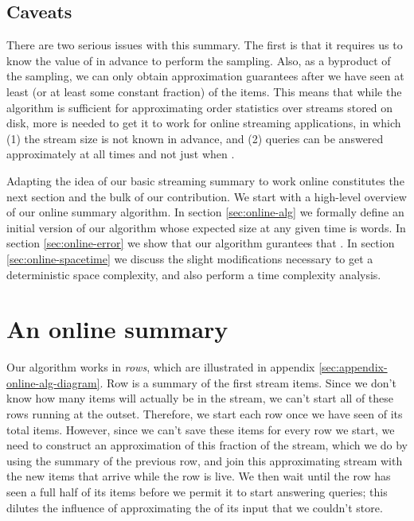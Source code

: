 \documentclass{article}
\theoremstyle{plain}
\begin{document}
\subsection{Caveats}

There are two serious issues with this summary. The first is that it requires us
to know the value of  in advance to perform the sampling. Also, as a
byproduct of the sampling, we can only obtain approximation guarantees after we
have seen at least  (or at least some constant fraction) of the items.
This means that while the algorithm is sufficient for approximating order
statistics over streams stored on disk, more is needed to get it to work for
online streaming applications, in which (1) the stream size  is not known in
advance, and (2) queries can be answered approximately at all times 
and not just when .

Adapting the idea of our basic streaming summary to work online constitutes the
next section and the bulk of our contribution.
We start with a high-level overview of our online summary algorithm.
In section \ref{sec:online-alg} we formally define an initial version of our
algorithm whose expected size at any given time is  words.
In section \ref{sec:online-error} we show that our algorithm gurantees that
.
In section \ref{sec:online-spacetime} we discuss the slight modifications
necessary to get a deterministic  space
complexity, and also perform a time complexity analysis.
 
\section{An online summary}
\label{sec:online}

Our algorithm works in \emph{rows}, which are illustrated in appendix
\ref{sec:appendix-online-alg-diagram}. Row  is a summary of the first  stream items. Since we don't know how many items will actually be in the
stream, we can't start all of these rows running at the outset. Therefore, we
start each row  once we have seen  of its total items. However,
since we can't save these items for every row we start, we need to construct an
approximation of this fraction of the stream, which we do by using the summary
of the previous row, and join this approximating stream with the new items that
arrive while the row is live. We then wait until the row has seen a full half of
its items before we permit it to start answering queries; this dilutes the
influence of approximating the  of its input that we couldn't store.
\end{document}
